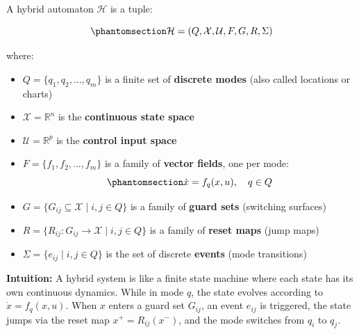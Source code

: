 \documentclass[
  letterpaper,
  DIV=11,
  numbers=noendperiod]{scrartcl}
\providecommand{\tightlist}{%
  \setlength{\itemsep}{0pt}\setlength{\parskip}{0pt}}\usepackage{longtable,booktabs,array}
\begin{document}
\begin{tcolorbox}[enhanced jigsaw, coltitle=black, titlerule=0mm, toprule=.15mm, opacitybacktitle=0.6, left=2mm, opacityback=0, rightrule=.15mm, leftrule=.75mm, breakable, colframe=quarto-callout-tip-color-frame, bottomtitle=1mm, toptitle=1mm, arc=.35mm, title=\textcolor{quarto-callout-tip-color}{\faLightbulb}\hspace{0.5em}{Definition: Hybrid Automaton}, bottomrule=.15mm, colback=white, colbacktitle=quarto-callout-tip-color!10!white]

A hybrid automaton \(\mathcal{H}\) is a tuple:

\begin{equation}\phantomsection\label{eq-hybrid-automaton}{
\mathcal{H} = (Q, \mathcal{X}, \mathcal{U}, F, G, R, \Sigma)
}\end{equation}

where:

\begin{itemize}
\tightlist
\item
  \(Q = \{q_1, q_2, \ldots, q_m\}\) is a finite set of \textbf{discrete
  modes} (also called locations or charts)
\item
  \(\mathcal{X} = \mathbb{R}^n\) is the \textbf{continuous state space}
\item
  \(\mathcal{U} = \mathbb{R}^p\) is the \textbf{control input space}
\item
  \(F = \{f_1, f_2, \ldots, f_m\}\) is a family of \textbf{vector
  fields}, one per mode:
  \begin{equation}\phantomsection\label{eq-mode-dynamics}{
  \dot{x} = f_q(x, u), \quad q \in Q
  }\end{equation}
\item
  \(G = \{G_{ij} \subseteq \mathcal{X} \mid i, j \in Q\}\) is a family
  of \textbf{guard sets} (switching surfaces)
\item
  \(R = \{R_{ij}: G_{ij} \to \mathcal{X} \mid i, j \in Q\}\) is a family
  of \textbf{reset maps} (jump maps)
\item
  \(\Sigma = \{e_{ij} \mid i, j \in Q\}\) is the set of discrete
  \textbf{events} (mode transitions)
\end{itemize}

\end{tcolorbox}

\textbf{Intuition:} A hybrid system is like a finite state machine where
each state has its own continuous dynamics. While in mode \(q\), the
state evolves according to \(\dot{x} = f_q(x,u)\). When \(x\) enters a
guard set \(G_{ij}\), an event \(e_{ij}\) is triggered, the state jumps
via the reset map \(x^+ = R_{ij}(x^-)\), and the mode switches from
\(q_i\) to \(q_j\).
\end{document}
